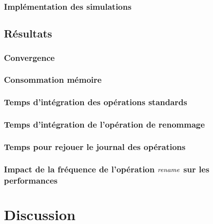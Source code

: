 \subsubsection{Implémentation des simulations}


\subsection{Résultats}


\subsubsection{Convergence}


\subsubsection{Consommation mémoire}


\subsubsection{Temps d'intégration des opérations standards}


\subsubsection{Temps d'intégration de l'opération de renommage}


\subsubsection{Temps pour rejouer le journal des opérations}


\subsubsection{Impact de la fréquence de l'opération $\mathit{rename}$ sur les performances}


\section{Discussion}

